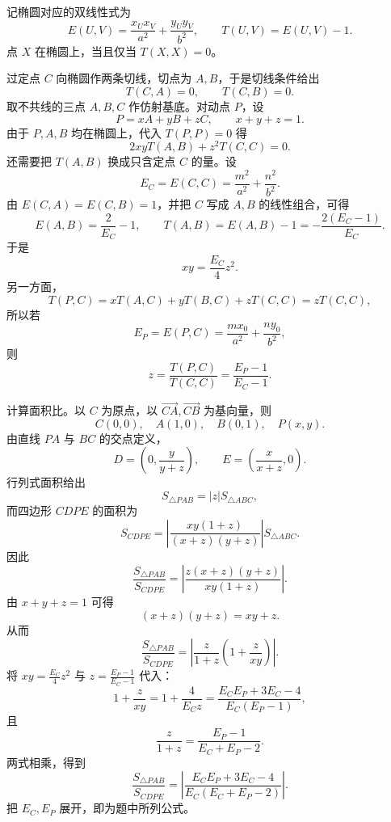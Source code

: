 \begin{solution}
记椭圆对应的双线性式为
\[
E(U,V)=\frac{x_Ux_V}{a^2}+\frac{y_Uy_V}{b^2},\qquad T(U,V)=E(U,V)-1.
\]
点 $X$ 在椭圆上，当且仅当 $T(X,X)=0$。

过定点 $C$ 向椭圆作两条切线，切点为 $A,B$，于是切线条件给出
\[
T(C,A)=0,\qquad T(C,B)=0.
\]
取不共线的三点 $A,B,C$ 作仿射基底。对动点 $P$，设
\[
P=xA+yB+zC,\qquad x+y+z=1.
\]
由于 $P,A,B$ 均在椭圆上，代入 $T(P,P)=0$ 得
\[
2xyT(A,B)+z^2T(C,C)=0.
\]
还需要把 $T(A,B)$ 换成只含定点 $C$ 的量。设
\[
E_C=E(C,C)=\frac{m^2}{a^2}+\frac{n^2}{b^2}.
\]
由 $E(C,A)=E(C,B)=1$，并把 $C$ 写成 $A,B$ 的线性组合，可得
\[
E(A,B)=\frac2{E_C}-1,\qquad T(A,B)=E(A,B)-1=-\frac{2(E_C-1)}{E_C}.
\]
于是
\[
xy=\frac{E_C}{4}z^2.
\]
另一方面，
\[
T(P,C)=xT(A,C)+yT(B,C)+zT(C,C)=zT(C,C),
\]
所以若
\[
E_P=E(P,C)=\frac{mx_0}{a^2}+\frac{ny_0}{b^2},
\]
则
\[
z=\frac{T(P,C)}{T(C,C)}=\frac{E_P-1}{E_C-1}.
\]

计算面积比。以 $C$ 为原点，以 $\overrightarrow{CA},\overrightarrow{CB}$ 为基向量，则
\[
C(0,0),\quad A(1,0),\quad B(0,1),\quad P(x,y).
\]
由直线 $PA$ 与 $BC$ 的交点定义，
\[
D=\left(0,\frac{y}{y+z}\right),\qquad
E=\left(\frac{x}{x+z},0\right).
\]
行列式面积给出
\[
S_{\triangle PAB}=|z|S_{\triangle ABC},
\]
而四边形 $CDPE$ 的面积为
\[
S_{CDPE}=\left|\frac{xy(1+z)}{(x+z)(y+z)}\right|S_{\triangle ABC}.
\]
因此
\[
\frac{S_{\triangle PAB}}{S_{CDPE}}
=\left|\frac{z(x+z)(y+z)}{xy(1+z)}\right|.
\]
由 $x+y+z=1$ 可得
\[
(x+z)(y+z)=xy+z.
\]
从而
\[
\frac{S_{\triangle PAB}}{S_{CDPE}}
=\left|\frac{z}{1+z}\left(1+\frac{z}{xy}\right)\right|.
\]
将 $xy=\frac{E_C}{4}z^2$ 与 $z=\frac{E_P-1}{E_C-1}$ 代入：
\[
1+\frac{z}{xy}
=1+\frac{4}{E_Cz}
=\frac{E_CE_P+3E_C-4}{E_C(E_P-1)},
\]
且
\[
\frac{z}{1+z}=\frac{E_P-1}{E_C+E_P-2}.
\]
两式相乘，得到
\[
\frac{S_{\triangle PAB}}{S_{CDPE}}
=\left|\frac{E_CE_P+3E_C-4}{E_C(E_C+E_P-2)}\right|.
\]
把 $E_C,E_P$ 展开，即为题中所列公式。
\end{solution}


